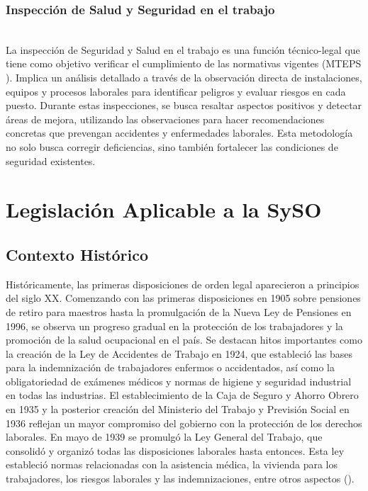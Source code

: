 \subsubsection{Inspección de Salud y Seguridad en el trabajo}\hfill\\
\indent
La inspección de Seguridad y Salud en el trabajo es una función técnico-legal que tiene como objetivo verificar el cumplimiento de las normativas vigentes (MTEPS \citeyear{Bolivia1979}). Implica un análisis detallado a través de la observación directa de instalaciones, equipos y procesos laborales para identificar peligros y evaluar riesgos en cada puesto. Durante estas inspecciones, se busca resaltar aspectos positivos y detectar áreas de mejora, utilizando las observaciones para hacer recomendaciones concretas que prevengan accidentes y enfermedades laborales. Esta metodología no solo busca corregir deficiencias, sino también fortalecer las condiciones de seguridad existentes.

\section{Legislación Aplicable a la SySO}
\subsection{Contexto Histórico}
Históricamente, las primeras disposiciones de orden legal aparecieron a principios del siglo XX. Comenzando con las primeras disposiciones en 1905 sobre pensiones de retiro para maestros hasta la promulgación de la Nueva Ley de Pensiones en 1996, se observa un progreso gradual en la protección de los trabajadores y la promoción de la salud ocupacional en el país.
Se destacan hitos importantes como la creación de la Ley de Accidentes de Trabajo en 1924, que estableció las bases para la indemnización de trabajadores enfermos o accidentados, así como la obligatoriedad de exámenes médicos y normas de higiene y seguridad industrial en todas las industrias.
El establecimiento de la Caja de Seguro y Ahorro Obrero en 1935 y la posterior creación del Ministerio del Trabajo y Previsión Social en 1936 reflejan un mayor compromiso del gobierno con la protección de los derechos laborales. En mayo de 1939 se promulgó la Ley General del Trabajo, que consolidó y organizó todas las disposiciones laborales hasta entonces. Esta ley estableció normas relacionadas con la asistencia médica, la vivienda para los trabajadores, los riesgos laborales y las indemnizaciones, entre otros aspectos (\cite{cervantesdiagnostico}).

